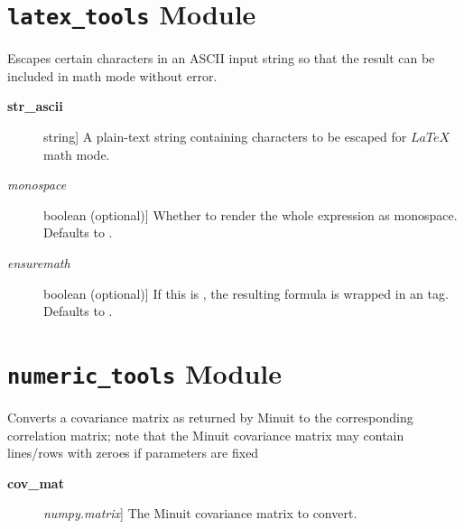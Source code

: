 \documentclass[a4paper,10pt,english]{sphinxmanual}
\begin{document}
\section{\texttt{latex\_tools} Module}
\label{index:module-kafe.latex_tools}\label{index:latex-tools-module}\label{index:module-latex_tools}

\begin{fulllineitems}
\label{index:kafe.latex_tools.ascii_to_latex_math}
Escapes certain characters in an ASCII input string so that the result
can be included in math mode without error.
\begin{description}
\item[{\textbf{str\_ascii}}] \leavevmode{[}string{]}
A plain-text string containing characters to be escaped for
\(LaTeX\) math mode.

\item[{\emph{monospace}}] \leavevmode{[}boolean (optional){]}
Whether to render the whole expression as monospace. Defaults to
.

\item[{\emph{ensuremath}}] \leavevmode{[}boolean (optional){]}
If this is , the resulting formula is wrapped in
an  tag. Defaults to .

\end{description}

\end{fulllineitems}



\section{\texttt{numeric\_tools} Module}
\label{index:module-kafe.numeric_tools}\label{index:numeric-tools-module}\label{index:module-numeric_tools}

\begin{fulllineitems}
\label{index:kafe.numeric_tools.MinuitCov_to_cor}
Converts a covariance matrix as returned by Minuit to the
corresponding correlation matrix; note that the Minuit
covariance matrix may contain lines/rows with zeroes if
parameters are fixed
\begin{description}
\item[{\textbf{cov\_mat}}] \leavevmode{[}\emph{numpy.matrix}{]}
The Minuit covariance matrix to convert.

\end{description}

\end{fulllineitems}
\end{document}
